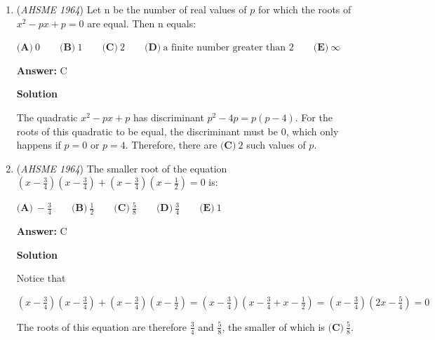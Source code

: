 \begin{enumerate}
The common ratio of this geometric progression is $\frac{3x+3}{2x+2} = \frac{3(x+1)}{2(x+1)} = \frac{3}{2}$.  (Note that $x \neq -1$ since the terms must be nonzero.)

 Therefore, $\frac{2x+2}{x} = \frac{3}{2}$.  So $4x + 4 = 3x$ and thus $x = -4$.  Thus the first three terms are $-4, -6, -9$ and the fourth term is $-9 \cdot \frac{3}{2} = -\frac{27}{2} = \boxed{\textbf{(B)} -13\frac{1}{2}}$



	\item (\textit{AHSME 1964}) Let n be the number of real values of $p$ for which the roots of 
$x^2-px+p=0$
are equal. Then n equals:


 $\textbf{(A)}\ 0 \qquad \textbf{(B)}\ 1 \qquad \textbf{(C)}\ 2 \qquad \textbf{(D)}\ \text{a finite number greater than 2}\qquad \textbf{(E)}\ \infty$

 \textbf{Answer: }C



\textbf{Solution}

The quadratic $x^2 - px + p$ has discriminant $p^2 - 4p = p(p-4)$.  For the roots of this quadratic to be equal, the discriminant must be $0$, which only happens if $p = 0$ or $p = 4$.  Therefore, there are $\boxed{\textbf{(C)}\ 2}$ such values of $p$.

 


	\item (\textit{AHSME 1964}) The smaller root of the equation 
$\left(x-\frac{3}{4}\right)\left(x-\frac{3}{4}\right)+\left(x-\frac{3}{4}\right)\left(x-\frac{1}{2}\right) =0$ is:


 $\textbf{(A)}\ -\frac{3}{4}\qquad \textbf{(B)}\ \frac{1}{2}\qquad \textbf{(C)}\ \frac{5}{8}\qquad \textbf{(D)}\ \frac{3}{4}\qquad \textbf{(E)}\ 1$

 \textbf{Answer: }C



\textbf{Solution}

Notice that 

 $\left(x-\frac{3}{4}\right)\left(x-\frac{3}{4}\right)+\left(x-\frac{3}{4}\right)\left(x-\frac{1}{2}\right) = \left(x - \frac{3}{4}\right)\left(x - \frac{3}{4} + x - \frac{1}{2}\right) = \left(x - \frac{3}{4}\right)\left(2x - \frac{5}{4}\right) = 0$

 The roots of this equation are therefore $\frac{3}{4}$ and $\frac{5}{8}$, the smaller of which is $\boxed{\textbf{(C)}\ \frac{5}{8}}$.

 



\end{enumerate}
